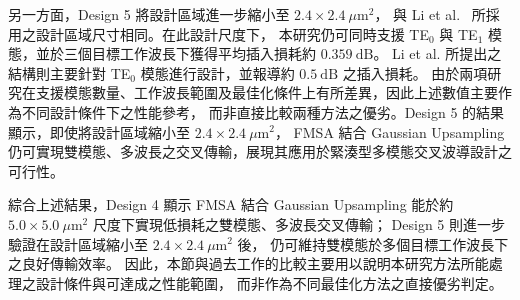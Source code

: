 另一方面，Design 5 將設計區域進一步縮小至 $2.4\times2.4~\mu\mathrm{m}^{2}$，
與 Li et al.~\cite{li2020ultracompact} 所採用之設計區域尺寸相同。在此設計尺度下，
本研究仍可同時支援 TE$_0$ 與 TE$_1$ 模態，並於三個目標工作波長下獲得平均插入損耗約 $0.359~\mathrm{dB}$。
Li et al. 所提出之結構則主要針對 TE$_0$ 模態進行設計，並報導約 $0.5~\mathrm{dB}$ 之插入損耗。
由於兩項研究在支援模態數量、工作波長範圍及最佳化條件上有所差異，因此上述數值主要作為不同設計條件下之性能參考，
而非直接比較兩種方法之優劣。Design 5 的結果顯示，即使將設計區域縮小至 $2.4\times2.4~\mu\mathrm{m}^{2}$，
FMSA 結合 Gaussian Upsampling 仍可實現雙模態、多波長之交叉傳輸，展現其應用於緊湊型多模態交叉波導設計之可行性。

綜合上述結果，Design 4 顯示 FMSA 結合 Gaussian Upsampling 能於約 $5.0\times5.0~\mu\mathrm{m}^{2}$ 尺度下實現低損耗之雙模態、多波長交叉傳輸；
Design 5 則進一步驗證在設計區域縮小至 $2.4\times2.4~\mu\mathrm{m}^{2}$ 後，
仍可維持雙模態於多個目標工作波長下之良好傳輸效率。
因此，本節與過去工作的比較主要用以說明本研究方法所能處理之設計條件與可達成之性能範圍，
而非作為不同最佳化方法之直接優劣判定。